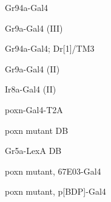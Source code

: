 \documentclass[17pt]{extarticle}
\begin{document}
\footnotesize
\newpage\vspace*{-0.15cm}
\begin{large}
Gr94a-Gal4 \\[0.5em]
\end{large}
\footnotesize
\newpage\vspace*{-0.15cm}
\begin{normalsize}
Gr9a-Gal4 (III) \\[0.5em]
\end{normalsize}
\footnotesize
\newpage\vspace*{-0.15cm}
\begin{footnotesize}
Gr94a-Gal4; Dr[1]/TM3 \\[0.5em]
\end{footnotesize}
\footnotesize
\newpage\vspace*{-0.15cm}
\begin{normalsize}
Gr9a-Gal4 (II) \\[0.5em]
\end{normalsize}
\footnotesize
\newpage\vspace*{-0.15cm}
\begin{normalsize}
Ir8a-Gal4 (II) \\[0.5em]
\end{normalsize}
\footnotesize
\newpage\vspace*{-0.15cm}
\begin{normalsize}
poxn-Gal4-T2A \\[0.5em]
\end{normalsize}
\footnotesize
\newpage\vspace*{-0.15cm}
\begin{normalsize}
poxn mutant DB \\[0.5em]
\end{normalsize}
\footnotesize
\newpage\vspace*{-0.15cm}
\begin{normalsize}
Gr5a-LexA DB \\[0.5em]
\end{normalsize}
\footnotesize
\newpage\vspace*{-0.15cm}
\begin{footnotesize}
poxn mutant, 67E03-Gal4 \\[0.5em]
\end{footnotesize}
\footnotesize
\newpage\vspace*{-0.15cm}
\begin{footnotesize}
poxn mutant, p[BDP]-Gal4 \\[0.5em]
\end{footnotesize}
\end{document}
